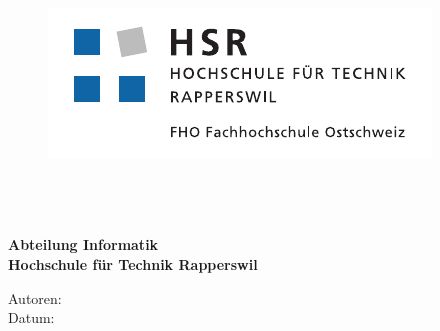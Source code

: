 \begin{titlepage}
\begin{flushleft}

\begin{figure}[tbp]
  \begin{minipage}[c]{0.4\textwidth}
    \includegraphics[width=\textwidth]{images/hsr_logo.pdf}
  \end{minipage}
  \hfill
\end{figure}



\noindent\begin{minipage}[t]{0.49\textwidth}
  \begin{flushleft}
    \vspace{0pt}
  \end{flushleft}
\end{minipage}
\hfill
\begin{minipage}[t]{0.49\textwidth}
  \begin{flushright}
    \vspace{0pt}
  \end{flushright}
\end{minipage}
\\[4cm]

{\Huge \bfseries \TITLE}\\[4cm]
{\huge \bfseries \SUBTITLE}\\[0.5cm]

{\large \bfseries Abteilung Informatik}\\
{\large \bfseries Hochschule für Technik Rapperswil}\\

\vfill

Autoren: \AUTHOR \\
Datum: {\DATE}

\end{flushleft}
\end{titlepage}
